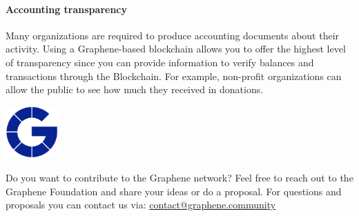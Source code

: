 \paragraph{Accounting transparency}
Many organizations are required to produce accounting documents about
their activity. Using a Graphene-based blockchain allows you to offer
the highest level of transparency since you can provide information to
verify balances and transactions through the Blockchain. For example,
non-profit organizations can allow the public to see how much they
received in donations.
\vfill
\begin{center}
\includegraphics[height=2cm]{figures/logo-graphene-blue-invert.png}
\end{center}
\vfill
Do you want to contribute to the Graphene network? Feel free to reach out to the Graphene Foundation and share your ideas or do a proposal. For questions and proposals you can contact us via: \href{mailto:contact@graphene.community}{contact@graphene.community}
